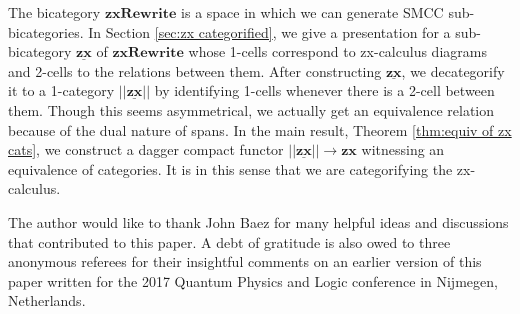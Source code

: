 \documentclass[./1--Catfying_zxCalc--Master.tex]{subfiles} %
\begin{document}
The bicategory $\mathbf{zxRewrite}$ 
is a space in which we can generate 
SMCC sub-bicategories. 
In Section \ref{sec:zx categorified}, 
we give a presentation for 
a sub-bicategory $\underline{\mathbf{zx}}$ 
of $\mathbf{zxRewrite}$ whose
1-cells correspond to 
zx-calculus diagrams and
2-cells to the relations between them.  
After constructing $\underline{\mathbf{zx}}$, 
we decategorify it to a 1-category 
$|| \underline{ \mathbf{zx} } ||$ 
by identifying 1-cells whenever 
there is a 2-cell between them.  
Though this seems asymmetrical, 
we actually get an equivalence relation
because of the dual nature of spans.  
In the main result, 
Theorem \ref{thm:equiv of zx cats}, 
we construct a dagger compact functor 
$|| \underline{ \mathbf{zx} } || \to \mathbf{zx}$ 
witnessing an equivalence of categories.  
It is in this sense that we are categorifying
the zx-calculus.

The author would like to thank 
John Baez for many helpful ideas and 
discussions that contributed to this paper. 
A debt of gratitude is also owed
to three anonymous referees for their
insightful comments on
an earlier version of this paper
written for the 2017 Quantum Physics and Logic 
conference in Nijmegen, Netherlands.

 
% 
\end{document}
